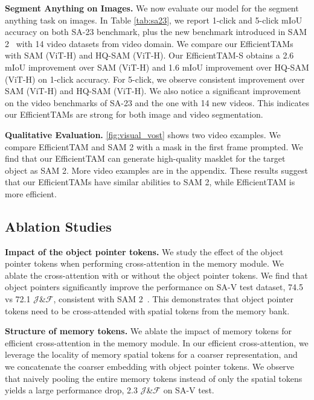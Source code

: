 
\noindent \textbf{Segment Anything on Images.} We now evaluate our model for the segment anything task on images. In Table \cref{tab:sa23}, we report 1-click and 5-click mIoU accuracy on both SA-23 benchmark, plus the new benchmark introduced in SAM 2~\citep{ravi2024sam} with 14 video datasets from video domain. We compare our EfficientTAMs with SAM (ViT-H) and HQ-SAM (ViT-H). Our EfficientTAM-S obtains a 2.6 mIoU improvement over SAM (ViT-H) and 1.6 mIoU improvement over HQ-SAM (ViT-H) on 1-click accuracy. For 5-click, we observe consistent improvement over SAM (ViT-H) and HQ-SAM (ViT-H). We also notice a significant improvement on the video benchmarks of SA-23 and the one with 14 new videos. This indicates our EfficientTAMs are strong for both image and video segmentation.


\noindent \textbf{Qualitative Evaluation.} 
\cref{fig:visual_vost} shows two video examples. We compare EfficientTAM and SAM 2 with a mask in the first frame prompted. We find that our EfficientTAM can generate high-quality masklet for the target object as SAM 2. More video examples are in the appendix. These results suggest that our EfficientTAMs have similar abilities to SAM 2, while EfficientTAM is more efficient. 

\vspace{-1mm}
\subsection{Ablation Studies}
\textbf{Impact of the object pointer tokens.} We study the effect of the object pointer tokens when performing cross-attention in the memory module. We ablate the cross-attention with or without the object pointer tokens. We find that object pointers significantly improve the performance on SA-V test dataset, 74.5 vs 72.1 $\mathcal{J}$\&$\mathcal{F}$, consistent with SAM 2~\citep{ravi2024sam}. This demonstrates that object pointer tokens need to be cross-attended with spatial tokens from the memory bank.

\noindent \textbf{Structure of memory tokens.} We ablate the impact of memory tokens for efficient cross-attention in the memory module. In our efficient cross-attention, we leverage the locality of memory spatial tokens for a coarser representation, and we concatenate the coarser embedding with object pointer tokens. We observe that naively pooling the entire memory tokens instead of only the spatial tokens yields a large performance drop, 2.3 $\mathcal{J}$\&$\mathcal{F}$ on SA-V test.

